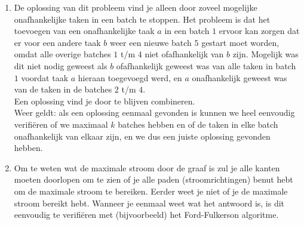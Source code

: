 \documentclass[11pt]{article}
\begin{document}
\begin{enumerate}
\begin{enumerate}
            \item De oplossing van dit probleem vind je alleen door zoveel mogelijke onafhankelijke taken in een batch te stoppen. Het probleem is dat het toevoegen van een onafhankelijke taak $a$ in een batch $1$ ervoor kan zorgen dat er voor een andere taak $b$ weer een nieuwe batch $5$ gestart moet worden, omdat alle overige batches $1$ t/m $4$ niet ofafhankelijk van $b$ zijn. Mogelijk was dit niet nodig geweest als $b$ ofafhankelijk geweest was van alle taken in batch $1$ voordat taak $a$ hieraan toegevoegd werd, en $a$ onafhankelijk geweest was van de taken in de batches $2$ t/m $4$.\\ Een oplossing vind je door te blijven combineren.\\ Weer geldt: als een oplossing eenmaal gevonden is kunnen we heel eenvoudig verifi\"{e}ren of we maximaal $k$ batches hebben en of de taken in elke batch onafhankelijk van elkaar zijn, en we dus een juiste oplossing gevonden hebben. 

            \item Om te weten wat de maximale stroom door de graaf is zul je alle kanten moeten doorlopen om te zien of je alle paden (stroomrichtingen) benut hebt om de maximale stroom te bereiken. Eerder weet je niet of je de maximale stroom bereikt hebt. Wanneer je eenmaal weet wat het antwoord is, is dit eenvoudig te verifi\"{e}ren met (bijvoorbeeld) het Ford-Fulkerson algoritme.

        \end{enumerate}

\end{enumerate}
\end{document}
